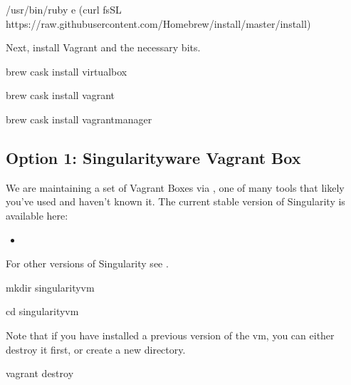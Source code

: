 \documentclass[letterpaper,10pt,english]{sphinxmanual}
\begin{document}
%
\begin{sphinxVerbatim}[commandchars=\\\{\}]
/usr/bin/ruby \PYGZhy{}e \PYGZdq{}\PYGZdl{}(curl \PYGZhy{}fsSL https://raw.githubusercontent.com/Homebrew/install/master/install)\PYGZdq{}
\end{sphinxVerbatim}

Next, install Vagrant and the necessary bits.

%
\begin{sphinxVerbatim}[commandchars=\\\{\}]
brew cask install virtualbox

brew cask install vagrant

brew cask install vagrant\PYGZhy{}manager
\end{sphinxVerbatim}


\subsection{Option 1: Singularityware Vagrant Box}
\label{\detokenize{installation:option-1-singularityware-vagrant-box}}
We are maintaining a set of Vagrant Boxes via , one of  many tools that likely you’ve used and haven’t known it. The current stable version of Singularity is available here:
\begin{itemize}
\item {} 

\end{itemize}

For other versions of Singularity see .

%
\begin{sphinxVerbatim}[commandchars=\\\{\}]
mkdir singularity\PYGZhy{}vm

cd singularity\PYGZhy{}vm
\end{sphinxVerbatim}

Note that if you have installed a previous version of the vm, you can either destroy it first, or create a new directory.

%
\begin{sphinxVerbatim}[commandchars=\\\{\}]
vagrant destroy
\end{sphinxVerbatim}
\end{document}
